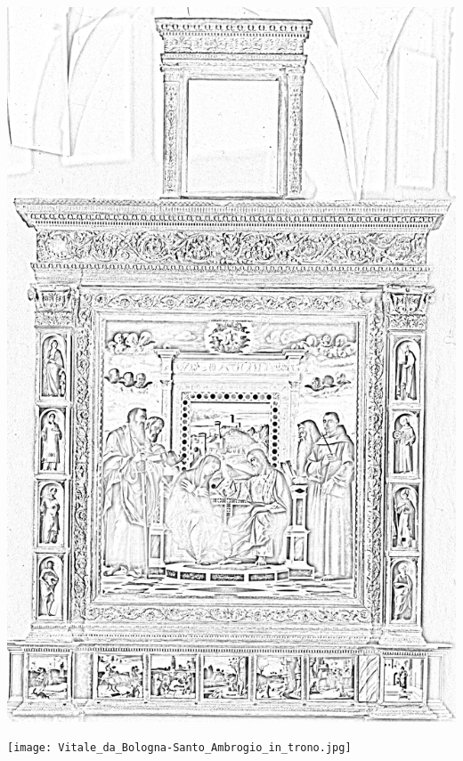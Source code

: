 \documentclass[hidelinks,12pt,a4paper]{article}
\begin{document}
\begin{adjustwidth}{-30mm}{-30mm}
			\thispagestyle{empty}
			\begin{minipage}{0.95\linewidth}
				\centering
				\includegraphics[scale=0.2]{Bellini_Giovanni-Incoronazione_della_Vergine.jpg}
			\end{minipage}
			
			\vspace*{\fill}
			\newpage
			
			\thispagestyle{empty}
			\begin{minipage}{0.95\linewidth}
				\centering
				\texttt{[image: Vitale\_da\_Bologna-Santo\_Ambrogio\_in\_trono.jpg]}
			\end{minipage}
			

\end{adjustwidth}
\end{document}
